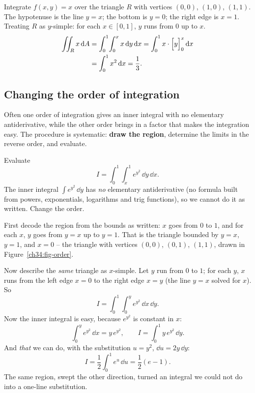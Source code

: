 \begin{example}
\label{ch34:ex-tri}
Integrate $f(x,y)=x$ over the triangle $R$ with vertices $(0,0)$, $(1,0)$,
$(1,1)$. The hypotenuse is the line $y=x$; the bottom is $y=0$; the right edge is
$x=1$. Treating $R$ as $y$-simple: for each $x\in[0,1]$, $y$ runs from $0$ up to
$x$.
\begin{align*}
  \iint_R x\,\mathrm{d} A &= \int_0^1\!\int_0^x x\,\mathrm{d} y\,\mathrm{d} x
  = \int_0^1 x\cdot\Big[y\Big]_{0}^{x}\,\mathrm{d} x \\
  &= \int_0^1 x^2\,\mathrm{d} x = \frac13 .
\end{align*}
\end{example}

\subsection{Changing the order of integration}

Often one order of integration gives an inner integral with no elementary
antiderivative, while the other order brings in a factor that makes the
integration easy. The procedure is systematic: \textbf{draw the region},
determine the limits in the reverse order, and evaluate.

\begin{example}
\label{ch34:ex-order}
Evaluate
\[
  I=\int_0^1\!\int_x^1 e^{y^2}\,\dd y\,\dd x .
\]
The inner integral $\int e^{y^2}\,\dd y$ has \emph{no} elementary
antiderivative (no formula built from powers, exponentials, logarithms and trig
functions), so we cannot do it as written. Change the order.

First decode the region from the bounds as written: $x$ goes from $0$ to $1$,
and for each $x$, $y$ goes from $y=x$ up to $y=1$. That is the triangle bounded
by $y=x$, $y=1$, and $x=0$ -- the triangle with vertices $(0,0)$, $(0,1)$,
$(1,1)$, drawn in Figure~\ref{ch34:fig-order}.

Now describe the \emph{same} triangle as $x$-simple. Let $y$ run from $0$ to $1$;
for each $y$, $x$ runs from the left edge $x=0$ to the right edge $x=y$ (the line
$y=x$ solved for $x$). So
\[
  I=\int_0^1\!\int_0^y e^{y^2}\,\dd x\,\dd y .
\]
Now the inner integral is easy, because $e^{y^2}$ is constant in $x$:
\[
  \int_0^y e^{y^2}\,\dd x=y\,e^{y^2},
  \qquad
  I=\int_0^1 y\,e^{y^2}\,\dd y .
\]
And \emph{that} we can do, with the substitution $u=y^2$, $\dd u=2y\,\dd y$:
\[
  I=\frac12\int_0^1 e^{u}\,\dd u=\frac12(e-1).
\]
The same region, swept the other direction, turned an integral we could not do
into a one-line substitution.
\end{example}

